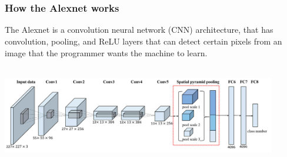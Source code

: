 \documentclass{beamer}
\begin{document}
\section{}
\begin{frame}

    
  \frametitle{How the Alexnet works}
The Alexnet is a convolution neural network (CNN) architecture, that has convolution, pooling, and ReLU layers that can detect certain pixels from an image that the programmer wants the machine to learn.\newline


   
   \newline
   


\includegraphics[height = 4.35cm, width= 12cm]{alexnet2.PNG}




\end{frame}
\end{document}
